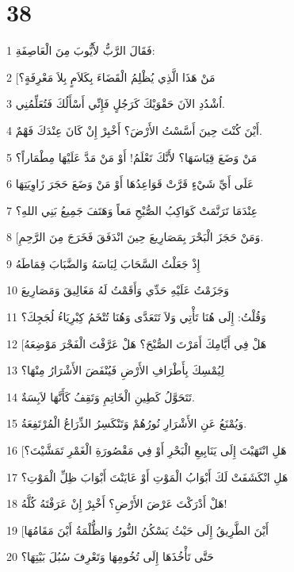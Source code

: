 \chapter{38}

\par 1 فَقَالَ الرَّبُّ لأَيُّوبَ مِنَ الْعَاصِفَةِ:
\par 2 [مَنْ هَذَا الَّذِي يُظْلِمُ الْقَضَاءَ بِكَلاَمٍ بِلاَ مَعْرِفَةٍ؟
\par 3 اُشْدُدِ الآنَ حَقْوَيْكَ كَرَجُلٍ فَإِنِّي أَسْأَلُكَ فَتُعَلِّمُنِي.
\par 4 أَيْنَ كُنْتَ حِينَ أَسَّسْتُ الأَرْضَ؟ أَخْبِرْ إِنْ كَانَ عِنْدَكَ فَهْمٌ.
\par 5 مَنْ وَضَعَ قِيَاسَهَا؟ لأَنَّكَ تَعْلَمُ! أَوْ مَنْ مَدَّ عَلَيْهَا مِطْمَاراً؟
\par 6 عَلَى أَيِّ شَيْءٍ قَرَّتْ قَوَاعِدُهَا أَوْ مَنْ وَضَعَ حَجَرَ زَاوِيَتِهَا
\par 7 عِنْدَمَا تَرَنَّمَتْ كَوَاكِبُ الصُّبْحِ مَعاً وَهَتَفَ جَمِيعُ بَنِي اللهِ؟
\par 8 [وَمَنْ حَجَزَ الْبَحْرَ بِمَصَارِيعَ حِينَ انْدَفَقَ فَخَرَجَ مِنَ الرَّحِمِ.
\par 9 إِذْ جَعَلْتُ السَّحَابَ لِبَاسَهُ وَالضَّبَابَ قِمَاطَهُ
\par 10 وَجَزَمْتُ عَلَيْهِ حَدِّي وَأَقَمْتُ لَهُ مَغَالِيقَ وَمَصَارِيعَ
\par 11 وَقُلْتُ: إِلَى هُنَا تَأْتِي وَلاَ تَتَعَدَّى وَهُنَا تُتْخَمُ كِبْرِيَاءُ لُجَجِكَ؟
\par 12 [هَلْ فِي أَيَّامِكَ أَمَرْتَ الصُّبْحَ؟ هَلْ عَرَّفْتَ الْفَجْرَ مَوْضِعَهُ
\par 13 لِيُمْسِكَ بِأَطْرَافِ الأَرْضِ فَيُنْفَضَ الأَشْرَارُ مِنْهَا؟
\par 14 تَتَحَوَّلُ كَطِينِ الْخَاتِمِ وَتَقِفُ كَأَنَّهَا لاَبِسَةٌ.
\par 15 وَيُمْنَعُ عَنِ الأَشْرَارِ نُورُهُمْ وَتَنْكَسِرُ الذِّرَاعُ الْمُرْتَفِعَةُ.
\par 16 [هَلِ انْتَهَيْتَ إِلَى يَنَابِيعِ الْبَحْرِ أَوْ فِي مَقْصُورَةِ الْغَمْرِ تَمَشَّيْتَ؟
\par 17 هَلِ انْكَشَفَتْ لَكَ أَبْوَابُ الْمَوْتِ أَوْ عَايَنْتَ أَبْوَابَ ظِلِّ الْمَوْتِ؟
\par 18 هَلْ أَدْرَكْتَ عَرْضَ الأَرْضِ؟ أَخْبِرْ إِنْ عَرَفْتَهُ كُلَّهُ!
\par 19 [أَيْنَ الطَّرِيقُ إِلَى حَيْثُ يَسْكُنُ النُّورُ وَالظُّلْمَةُ أَيْنَ مَقَامُهَا
\par 20 حَتَّى تَأْخُذَهَا إِلَى تُخُومِهَا وَتَعْرِفَ سُبُلَ بَيْتِهَا؟

